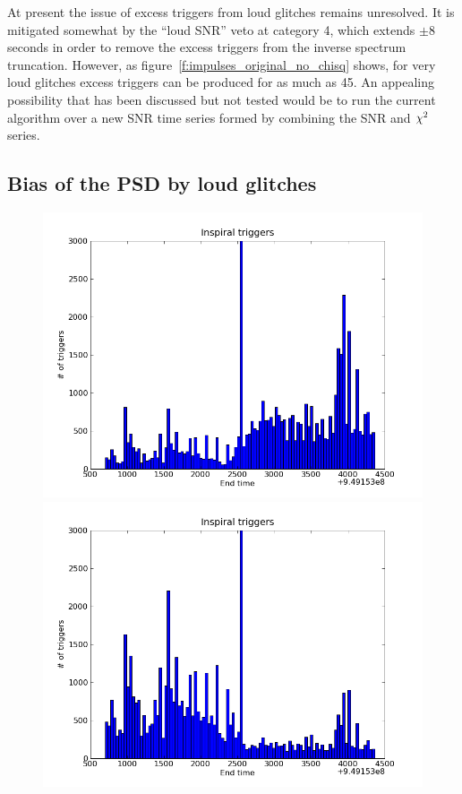 At present the issue of excess triggers from loud glitches remains
unresolved.  It is mitigated somewhat by the ``loud SNR'' veto at
category 4, which extends $\pm 8$ seconds in order to remove the
excess triggers from the inverse spectrum truncation.  However, as
figure~\ref{f:impulses_original_no_chisq} shows, for very loud
glitches excess triggers can be produced for as much as 45.  An
appealing possibility that has been discussed but not tested would be
to run the current algorithm over a new SNR time series formed by
combining the SNR and $\chi^2$ series.

\subsection{Bias of the PSD by loud glitches}
\label{ssec:sarlacc}

\begin{figure}
  \includegraphics[width=0.5\linewidth]{figures/detchar/H1-endtime_hist_ORIG}
  \includegraphics[width=0.5\linewidth]{figures/detchar/H1-endtime_hist_RESEG}
  \caption[] {
  \label{f:}
}
\end{figure}%


